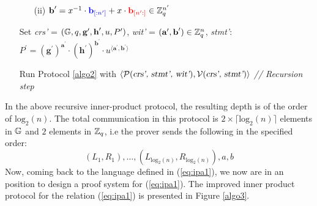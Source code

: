 \begin{mdframed}[skipabove=\topsep]
\begin{itemize}[itemsep=4pt]
\begin{enumerate}[itemsep=5pt]
            \item[(ii)] $\textbf{b}^{\prime} = x^{-1} \cdot
            \textcolor{blue}{\textbf{b}_{[:n^{\prime}]}} + x\cdot
            \textcolor{red}{\textbf{b}_{[n^{\prime}:]}}
            \in \mathbb{Z}^{n^{\prime}}_q$
        \end{enumerate}

        \item[] Set \textsl{crs'} = $(\mathbb{G}, q, \textbf{g}^{\prime}, \textbf{h}^{\prime}, u, P^{\prime})$, \textsl{wit'} = $(\textbf{a}^{\prime}, \textbf{b}^{\prime}) \in \mathbb{Z}_q^n$, \textsl{stmt'}: $P^{\prime} = (\textbf{g}^{\prime})^{\textbf{a}^{\prime}} \cdot (\textbf{h}^{\prime})^{\textbf{b}^{\prime}} \cdot u^{\langle \textbf{a}^{\prime},\textbf{b}^{\prime} \rangle}$
      
        \item[] Run Protocol \ref{algo2} with $\langle \mathcal{P}(\textsl{crs', stmt', wit'}), \mathcal{V}(\textsl{crs', stmt'}) \rangle$  \hfill{\footnotesize \textit{// Recursion step}}
      
    \end{itemize}
\end{mdframed}
\vspace{1cm}

In the above recursive inner-product protocol, the resulting depth is of the order of $ \text{log}_2(n)$. The total communication in this protocol is $2 \times \lceil \text{log}_2(n) \rceil$ elements in $\mathbb{G}$ and $2$ elements in $\mathbb{Z}_q$, i.e the prover sends the following in the specified order:
\begin{equation*}
    (L_1, R_1), \dots, (L_{\text{log}_2(n)}, R_{\text{log}_2(n)}), a, b
\end{equation*}
Now, coming back to the language defined in (\ref{eq:ipa1}), we now are in an position to design a proof system for (\ref{eq:ipa1}). 
The improved inner product protocol for the relation (\ref{eq:ipa1}) is presented in Figure \ref{algo3}.
\vspace{0.2cm}

